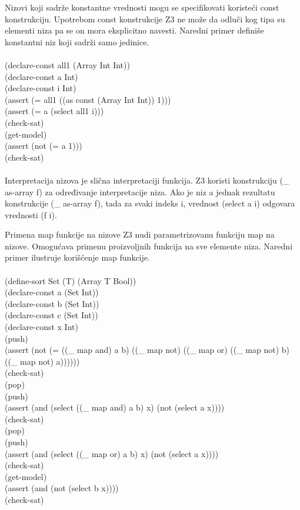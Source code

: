 \documentclass[12pt,oneside]{memoir}
\begin{document}
Nizovi koji sadrže konstantne vrednosti mogu se specifikovati koristeći const konstrukciju. Upotrebom const konstrukcije Z3 ne može da odluči kog tipa su elementi niza pa se on mora eksplicitno navesti. Naredni primer definiše konstantni niz koji sadrži samo jedinice.
\\
\\(declare-const all1 (Array Int Int))
\\(declare-const a Int)
\\(declare-const i Int)
\\(assert (= all1 ((as const (Array Int Int)) 1)))
\\(assert (= a (select all1 i)))
\\(check-sat)
\\(get-model)
\\(assert (not (= a 1)))
\\(check-sat)
\\
\\
Interpretacija nizova je slična interpretaciji funkcija. Z3 koristi konstrukciju (\_ as-array f) za određivanje interpretacije niza. Ako je niz a jednak rezultatu konstrukcije (\_ as-array f), tada za svaki indeks i, vrednost (select a i) odgovara vrednosti (f i). 

Primena map funkcije na nizove
Z3 nudi parametrizovanu funkciju map na nizove. Omogućava primenu proizvoljnih funkcija na sve elemente niza. Naredni primer ilustruje korišćenje map funkcije.
\\
\\(define-sort Set (T) (Array T Bool))
\\(declare-const a (Set Int))
\\(declare-const b (Set Int))
\\(declare-const c (Set Int))
\\(declare-const x Int)
\\(push)
\\(assert (not (= ((\_ map and) a b) ((\_ map not) ((\_ map or) ((\_ map not) b) ((\_ map not) a))))))
\\(check-sat)
\\(pop)
\\(push) 
\\(assert (and (select ((\_ map and) a b) x) (not (select a x))))
\\(check-sat)
\\(pop)
\\(push) 
\\(assert (and (select ((\_ map or) a b) x) (not (select a x))))
\\(check-sat)
\\(get-model)
\\(assert (and (not (select b x))))
\\(check-sat)
\end{document}
